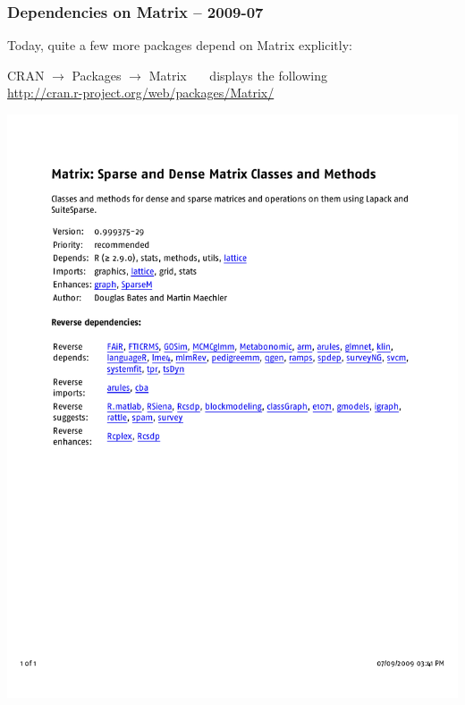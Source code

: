 \documentclass[dvipsnames,pdflatex,beamer]{beamer}
\begin{document}
\begin{frame}\frametitle{Dependencies on Matrix -- 2009-07}
  Today, quite a few more packages depend on Matrix explicitly:

  CRAN $\to$ Packages $\to$ Matrix  \ \ \     displays the following \\
   \qquad\qquad \url{http://cran.r-project.org/web/packages/Matrix/}

   \begin{block}{}
     \includegraphics[width=1.\textwidth,viewport=40 400 580 730,clip]{figs/Matrix-CRAN-depend-2}
   \end{block}
\end{frame}
\end{document}
